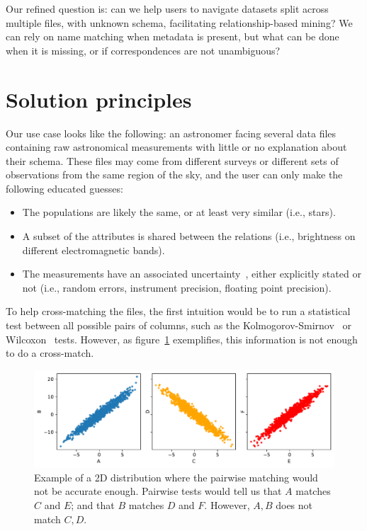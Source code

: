 Our refined question is: can we help users to navigate datasets split across multiple
files, with unknown schema, facilitating relationship-based mining?
We can rely on name matching when metadata is present, but what can be done when
it is missing, or if correspondences are not unambiguous?

\section{Solution principles}
\label{sec:gaps/principles}

Our use case looks like the following: an astronomer facing several
data files containing raw astronomical measurements
with little or no explanation about their schema. These files may come from different
surveys or different sets of observations from the same region of the sky,
and the user can only make the following educated guesses:

\begin{itemize}
    \item The populations are likely the same, or at least very similar
    (i.e., stars).
    \item A subset of the attributes is shared between the relations (i.e.,
    brightness on different electromagnetic bands).
    \item The measurements have an associated uncertainty~\cite{Stonebraker2009},
    either explicitly stated or not (i.e., random errors, instrument precision,
    floating point precision).
\end{itemize}

To help cross-matching the files, the first intuition would be to run a statistical
test between all possible pairs of columns,
such as the Kolmogorov-Smirnov~\cite{Hodges1958} or Wilcoxon~\cite{Wilcoxon1945} tests.
However, as figure~\ref{fig:pairwise_ind} exemplifies, this information is not enough to 
do a cross-match.

\begin{figure}[htpb]
    \centering
    \includegraphics[width=\linewidth]{images/4_gaps/no2ind}
    \caption[Example of a 2D distribution where the pairwise matching is not enough]{
        Example of a 2D distribution where the pairwise matching would not be accurate enough.
        Pairwise tests would tell us that $A$ matches $C$ and $E$; and that $B$ matches $D$ and $F$.
        However, $A,B$ does not match $C,D$.
    }
    \label{fig:pairwise_ind}
\end{figure}

